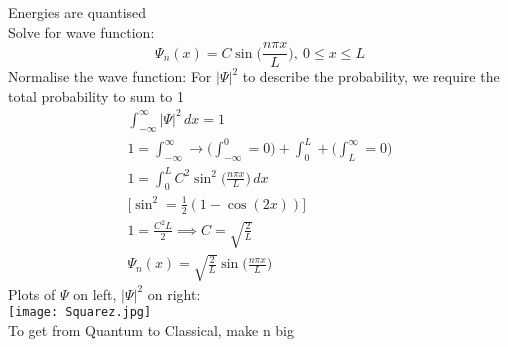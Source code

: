 \documentclass[a4paper, 11pt, fleqn, normalem]{report}
\begin{document}
Energies are quantised \\
Solve for wave function:
\begin{equation*}
    \Psi_{n}(x) = C\sin\Big(\frac{n\pi x}{L}\Big),~0 \leq x \leq L
\end{equation*}
Normalise the wave function: For $|\Psi|^{2}$ to describe the probability, we require the total probability to sum to 1
\begin{gather*}
    \int_{-\infty}^{\infty} |\Psi|^{2}\,dx = 1 \\
    1 = \int_{-\infty}^{\infty} \rightarrow \Bigg(\int_{-\infty}^{0} = 0\Bigg) + \int_{0}^{L} + \Bigg(\int_{L}^{\infty} = 0\Bigg) \\
    1 = \int_{0}^{L} C^{2}\sin^{2}\Big(\frac{n\pi x}{L}\Big)\,dx \\
    \Big[\sin^{2} = \frac{1}{2}(1 - \cos(2x))\Big] \\
    1 = \frac{C^{2}L}{2} \implies C = \sqrt{\frac{2}{L}} \\
    \Psi_{n}(x) = \sqrt{\frac{2}{L}}\sin\Big(\frac{n\pi x}{L}\Big)
\end{gather*}
Plots of $\Psi$ on left, $|\Psi|^{2}$ on right: \\
\texttt{[image: Squarez.jpg]} \\
To get from Quantum to Classical, make n big
\end{document}
